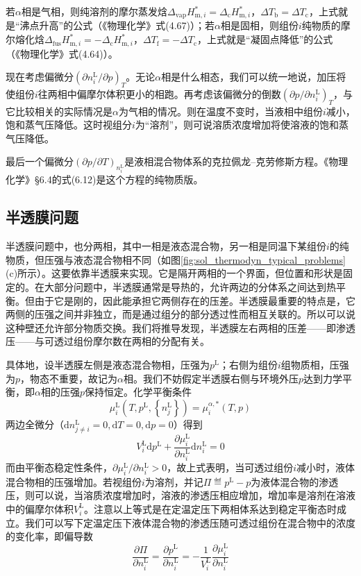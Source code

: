 \documentclass[main.tex]{subfiles}
\begin{document}
若$\alpha$相是气相，则纯溶剂的摩尔蒸发焓$\Delta_\text{vap}H_{\text{m},i}^*=\Delta_\text{c}H_{\text{m},i}^*$，$\Delta T_\text{b}=\Delta T_\text{c}$，上式就是“沸点升高”的公式（《物理化学》式(4.67)）；若$\alpha$相是固相，则组份$i$纯物质的摩尔熔化焓$\Delta_\text{fus}H_{\text{m},i}^*=-\Delta_\text{c}H_{\text{m},i}^*$，$\Delta T_\text{f}=-\Delta T_\text{c}$，上式就是“凝固点降低”的公式（《物理化学》式(4.64)）。

现在考虑偏微分$\left(\partial n_i^\text{L}/\partial p\right)_T$。无论$\alpha$相是什么相态，我们可以统一地说，加压将使组份$i$往两相中偏摩尔体积更小的相跑。再考虑该偏微分的倒数$\left(\partial p/\partial n_i^\text{L}\right)_T$，与它比较相关的实际情况是$\alpha$为气相的情况。则在温度不变时，当液相中组份$i$减小，饱和蒸气压降低。这时视组分$i$为“溶剂”，则可说溶质浓度增加将使溶液的饱和蒸气压降低。

最后一个偏微分$\left(\partial p/\partial T\right)_{n_i^\text{L}}$是液相混合物体系的克拉佩龙--克劳修斯方程。《物理化学》\S6.4的式(6.12)是这个方程的纯物质版。

\subsection{半透膜问题}\label{sec:II.5.4_semipermeable_membrane}
半透膜问题中，也分两相，其中一相是液态混合物，另一相是同温下某组份$i$的纯物质，但压强与液态混合物相不同（如图\ref{fig:sol_thermodyn_typical_problems}(c)所示）。这要依靠半透膜来实现。它是隔开两相的一个界面，但位置和形状是固定的。在大部分问题中，半透膜通常是导热的，允许两边的分体系之间达到热平衡。但由于它是刚的，因此能承担它两侧存在的压差。半透膜最重要的特点是，它两侧的压强之间并非独立，而是通过组分的部分透过性而相互关联的。所以可以说这种壁还允许部分物质交换。我们将推导发现，半透膜左右两相的压差——即渗透压——与可透过组份摩尔数在两相的分配有关。

具体地，设半透膜左侧是液态混合物相，压强为$p^\text{L}$；右侧为组份$i$组物质相，压强为$p$，物态不重要，故记为$\alpha$相。我们不妨假定半透膜右侧与环境外压$p$达到力学平衡，即$\alpha$相的压强$p$保持恒定。化学平衡条件
\begin{equation}\label{eq:II.5_osmotic_equilibrium}
  \mu_i^\text{L}\left(T,p^\text{L},\left\{n_j^\text{L}\right\}\right)=\mu_i^{\alpha,*}\left(T,p\right)
\end{equation}
两边全微分（$\mathrm{d}n_{j\neq i}^\text{L}=0,\mathrm{d}T=0,\mathrm{d}p=0$）得到
\[V_i^\text{L}\mathrm{d}p^\text{L}+\frac{\partial \mu_i^\text{L}}{\partial n_i^\text{L}}\mathrm{d}n_i^\text{L}=0\]
而由平衡态稳定性条件，$\partial\mu_i^\text{L}/\partial n_i^\text{L}>0$，故上式表明，当可透过组份$i$减小时，液体混合物相的压强增加。若视组份$i$为溶剂，并记$\Pi\eqdef p^\text{L}-p$为液体混合物的渗透压，则可以说，当溶质浓度增加时，溶液的渗透压相应增加，增加率是溶剂在溶液中的偏摩尔体积$V_i^\text{L}$。注意以上等式是在定温定压下两相体系达到稳定平衡态时成立。我们可以写下定温定压下液体混合物的渗透压随可透过组份在混合物中的浓度的变化率，即偏导数
\begin{equation}\label{eq:II.5_osmotic_pressure_partial_derivative}
  \frac{\partial\Pi}{\partial n_i^\text{L}}=\frac{\partial p^\text{L}}{\partial n_i^\text{L}}=-\frac{1}{V_i^\text{L}}\frac{\partial\mu_i^\text{L}}{\partial n_i^\text{L}}
\end{equation}
\end{document}
